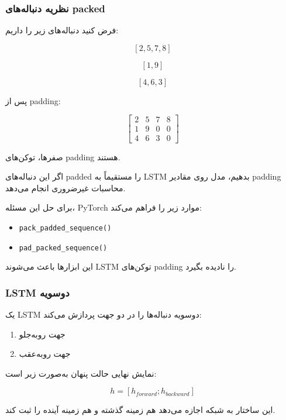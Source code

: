 \documentclass[12pt,a4paper]{article}
\begin{document}
\subsubsection{نظریه دنباله‌های packed}

فرض کنید دنباله‌های زیر را داریم:

\[
[2,5,7,8]
\]

\[
[1,9]
\]

\[
[4,6,3]
\]

پس از padding:

\[
\begin{bmatrix}
	2 & 5 & 7 & 8 \\
	1 & 9 & 0 & 0 \\
	4 & 6 & 3 & 0
\end{bmatrix}
\]

صفرها، توکن‌های padding هستند.

اگر این دنباله‌های padded را مستقیماً به LSTM بدهیم، مدل روی مقادیر padding محاسبات غیرضروری انجام می‌دهد.

برای حل این مسئله، PyTorch موارد زیر را فراهم می‌کند:

\begin{itemize}
	\item \texttt{pack\_padded\_sequence()}
	\item \texttt{pad\_packed\_sequence()}
\end{itemize}

این ابزارها باعث می‌شوند LSTM توکن‌های padding را نادیده بگیرد.

\subsubsection{LSTM دو‌سویه}

یک LSTM دو‌سویه دنباله‌ها را در دو جهت پردازش می‌کند:

\begin{enumerate}
	\item جهت رو‌به‌جلو
	\item جهت رو‌به‌عقب
\end{enumerate}

نمایش نهایی حالت پنهان به‌صورت زیر است:

\[
h = [h_{forward}; h_{backward}]
\]

این ساختار به شبکه اجازه می‌دهد هم زمینه گذشته و هم زمینه آینده را ثبت کند.
\end{document}
